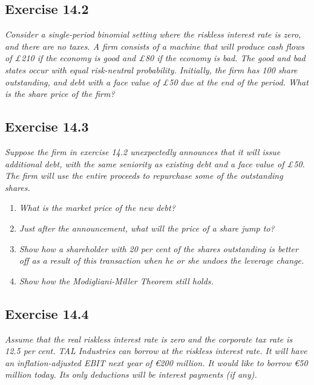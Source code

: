 \documentclass[]{book}
\newcommand{\euro}{€}
\theoremstyle{definition}
\theoremstyle{definition}
\theoremstyle{remark}
\begin{document}
\subsection{Exercise 14.2}\label{exercise-14.2}

\emph{Consider a single-period binomial setting where the riskless
interest rate is zero, and there are no taxes. A firm consists of a
machine that will produce cash flows of £210 if the economy is good and
£80 if the economy is bad. The good and bad states occur with equal
risk-neutral probability. Initially, the firm has 100 share outstanding,
and debt with a face value of £50 due at the end of the period. What is
the share price of the firm?} \citep[p.492]{book}

\subsection{Exercise 14.3}\label{exercise-14.3}

\emph{Suppose the firm in exercise 14.2 unexpectedly announces that it
will issue additional debt, with the same seniority as existing debt and
a face value of £50. The firm will use the entire proceeds to repurchase
some of the outstanding shares.} \citep[p.492]{book}

\begin{enumerate}
\def\labelenumi{\alph{enumi}.}
\item
  \emph{What is the market price of the new debt?} \citep[p.492]{book}
\item
  \emph{Just after the announcement, what will the price of a share jump
  to?} \citep[p.492]{book}
\item
  \emph{Show how a shareholder with 20 per cent of the shares
  outstanding is better off as a result of this transaction when he or
  she undoes the leverage change.} \citep[p.492]{book}
\item
  \emph{Show how the Modigliani-Miller Theorem still holds.}
  \citep[p.492]{book}
\end{enumerate}

\subsection{Exercise 14.4}\label{exercise-14.4}

\emph{Assume that the real riskless interest rate is zero and the
corporate tax rate is 12.5 per cent. TAL Industries can borrow at the
riskless interest rate. It will have an inflation-adjusted EBIT next
year of \euro{}200 million. It would like to borrow \euro{}50 million
today. Its only deductions will be interest payments (if any).}
\citep[p.492]{book}
\end{document}
